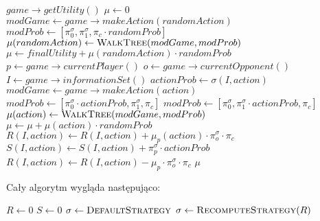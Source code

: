\documentclass[licencjacka]{pracamgr}
\begin{document}
\begin{algorithmic}
            \State \Return $game \rightarrow getUtility()$
        \EndIf
        \State $\mu \gets 0$ 
                \State $modGame \gets game \rightarrow makeAction(randomAction)$
                \State $modProb \gets [\pi_0^{\sigma}, \pi_1^{\sigma}, \pi_c \cdot randomProb ]$
                \State $\mu(randomAction) \gets \Call{WalkTree}{modGame, modProb}$
                \State $\mu \gets finalUtility + \mu(randomAction) \cdot randomProb$
            \EndFor
        \Else
            \State $p \gets game \rightarrow currentPlayer()$
            \State $o \gets game \rightarrow currentOpponent()$
            \State $I \gets game \rightarrow informationSet()$
                \State $actionProb \gets \sigma(I, action)$
                \State $modGame \gets game \rightarrow makeAction(action)$
                    \State $modProb \gets [\pi_0^{\sigma} \cdot actionProb, \pi_1^{\sigma}, \pi_c]$
                \Else
                    \State $modProb \gets [\pi_0^{\sigma}, \pi_1^{\sigma} \cdot actionProb, \pi_c]$
                \EndIf
                \State $\mu(action) \gets \Call{WalkTree}{modGame, modProb}$
                \State $\mu \gets \mu + \mu(action) \cdot randomProb$
                \State $R(I, action) \gets R(I, action) + \mu_{p}(action) \cdot \pi_{o}^{\sigma} \cdot \pi_c $
                \State $S(I, action) \gets S(I, action) + \pi_{p}^{\sigma} \cdot actionProb $
            \EndFor
                \State $R(I, action) \gets R(I, action) - \mu_{p} \cdot \pi_{o}^{\sigma} \cdot \pi_c $
            \EndFor
        \EndIf
    \State \Return $\mu$
    \EndFunction
\end{algorithmic}

$\,$ \\
\noindent
Cały algorytm wygląda następująco: \\

\begin{algorithmic}
        \State $R \gets 0$
        \State $S \gets 0$
        \State $\sigma \gets \Call{DefaultStrategy}{}$
            \State {}
            \State $\sigma \gets \Call{RecomputeStrategy}{R}$
        \EndFor
        \State \Return {}
    \EndFunction
\end{algorithmic}
\end{document}
